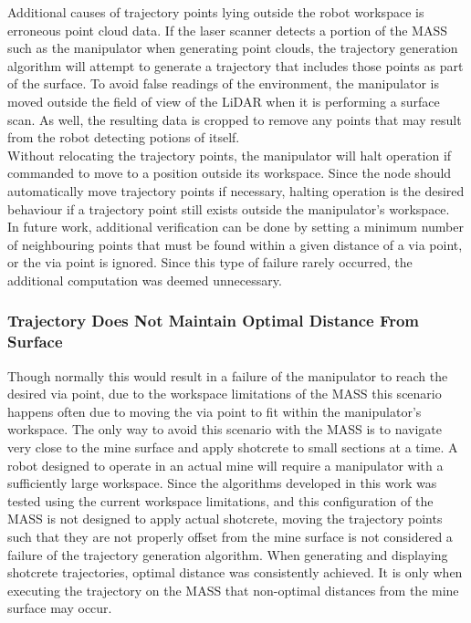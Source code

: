 Additional causes of trajectory points lying outside the robot workspace is erroneous point cloud data. If the laser scanner detects a portion of the MASS such as the manipulator when generating point clouds, the trajectory generation algorithm will attempt to generate a trajectory that includes those points as part of the surface. To avoid false readings of the environment, the manipulator is moved outside the field of view of the LiDAR when it is performing a surface scan. As well, the resulting data is cropped to remove any points that may result from the robot detecting potions of itself.\\

Without relocating the trajectory points, the manipulator will halt operation if commanded to move to a position outside its workspace. Since the  node should automatically move trajectory points if necessary, halting operation is the desired behaviour if a trajectory point still exists outside the manipulator's workspace.\\

In future work, additional verification can be done by setting a minimum number of neighbouring points that must be found within a given distance of a via point, or the via point is ignored. Since this type of failure rarely occurred, the additional computation was deemed unnecessary.\\

\subsubsection{Trajectory Does Not Maintain Optimal Distance From Surface}

Though normally this would result in a failure of the manipulator to reach the desired via point, due to the workspace limitations of the MASS this scenario happens often due to moving the via point to fit within the manipulator's workspace. The only way to avoid this scenario with the MASS is to navigate very close to the mine surface and apply shotcrete to small sections at a time. A robot designed to operate in an actual mine will require a manipulator with a sufficiently large workspace. Since the algorithms developed in this work was tested using the current workspace limitations, and this configuration of the MASS is not designed to apply actual shotcrete, moving the trajectory points such that they are not properly offset from the mine surface is not considered a failure of the trajectory generation algorithm. When generating and displaying shotcrete trajectories, optimal distance was consistently achieved. It is only when executing the trajectory on the MASS that non-optimal distances from the mine surface may occur.\\

